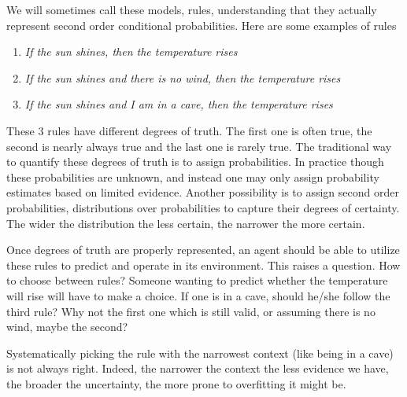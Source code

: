 \documentclass[runningheads]{llncs}
\begin{document}
We will sometimes call these models, rules, understanding that they
actually represent second order conditional probabilities. Here are
some examples of rules
\begin{enumerate}
\item {\it If the sun shines, then the temperature rises}
\item {\it If the sun shines and there is no wind, then the temperature rises}
\item {\it If the sun shines and I am in a cave, then the temperature
    rises}
\end{enumerate}

These 3 rules have different degrees of truth. The first one is often
true, the second is nearly always true and the last one is rarely
true. The traditional way to quantify these degrees of truth is to
assign probabilities. In practice though these probabilities are
unknown, and instead one may only assign probability estimates based
on limited evidence. Another possibility is to assign second order
probabilities, distributions over probabilities to capture their
degrees of certainty. The wider the distribution the less certain, the
narrower the more certain.





Once degrees of truth are properly represented, an agent should be
able to utilize these rules to predict and operate in its
environment. This raises a question. How to choose between rules?
Someone wanting to predict whether the temperature will rise will have
to make a choice. If one is in a cave, should he/she follow the third
rule? Why not the first one which is still valid, or assuming there is
no wind, maybe the second?

Systematically picking the rule with the narrowest context (like being
in a cave) is not always right. Indeed, the narrower the context the
less evidence we have, the broader the uncertainty, the more prone to
overfitting it might be.
\end{document}
